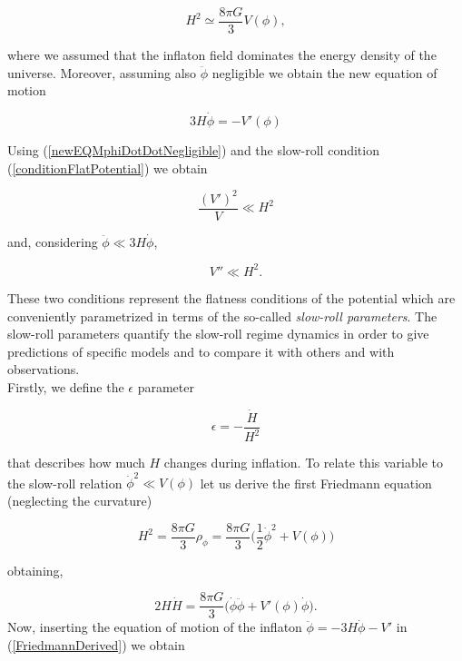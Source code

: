 \documentclass[11pt,a4paper,twoside]{book}
\begin{document}
\begin{equation}
	\label{friedMannEqDuringInflation}
	H^{2} \simeq \frac{8\pi G}{3} V(\phi),
\end{equation}

where we assumed that the inflaton field dominates the energy density of the universe. Moreover, assuming also $\ddot{\phi}$ negligible we obtain the new equation of motion

\begin{equation}
	\label{newEQMphiDotDotNegligible}
	3H\dot{\phi} = -V'(\phi)
\end{equation}

Using (\ref{newEQMphiDotDotNegligible}) and the slow-roll condition (\ref{conditionFlatPotential}) we obtain

\begin{equation}
	\label{condition1}
	\frac{(V')^{2}}{V} \ll H^{2}
\end{equation}

and, considering $\ddot{\phi} \ll 3H\dot{\phi}$,

\begin{equation}
	\label{condition2}
V'' \ll H^{2}	.
\end{equation}

These two conditions represent the flatness conditions of the potential which are conveniently parametrized in terms of the so-called \textit{slow-roll parameters}.
The slow-roll parameters quantify the slow-roll regime dynamics in order to give predictions of specific models and to compare it with others and with observations.\\
Firstly, we define the $\epsilon$ parameter

\begin{equation}
	\label{epsilon}
	\epsilon = - \frac{\dot{H}}{H^{2}}
\end{equation}

that describes how much $ H $ changes during inflation.
To relate this variable to the slow-roll relation $ \dot{\phi}^{2} \ll V(\phi) $ let us derive the first Friedmann equation (neglecting the curvature)

\begin{equation}
	\label{derivingEpsilon1}
	H^{2}=\frac{8\pi G}{3}\rho_{\phi} = \frac{8\pi G}{3} \Big (\frac{1}{2}\dot{\phi}^{2} + V(\phi) \Big )
\end{equation}

obtaining,

\begin{equation}
	\label{FriedmannDerived}
	2H\dot{H} = \frac{8\pi G}{3} \Big (\dot{\phi} \ddot{\phi} + V'(\phi)\dot{\phi} \Big ).
\end{equation}
Now, inserting the equation of motion of the inflaton $ \ddot{\phi} = -3H\dot{\phi} - V'  $ in (\ref{FriedmannDerived}) we obtain
\end{document}
